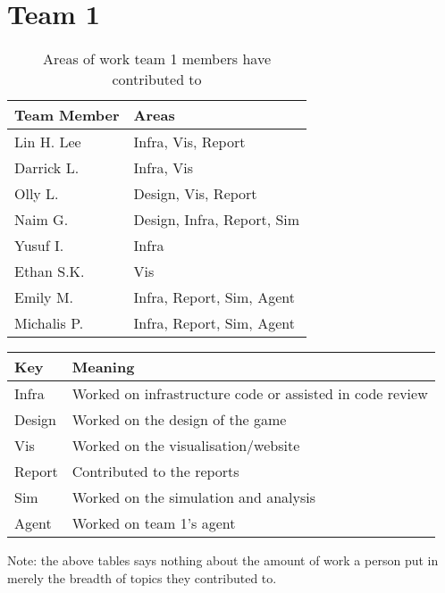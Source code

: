 \section{Team 1}
\label{sec:roles_appendix:team1}

\begin{table}[!h]
    \centering
    \begin{tabular}{|l|l|}
    \hline
    \textbf{Team Member} & \textbf{Areas}     \\ \hline
    Lin H. Lee  & Infra, Vis, Report         \\
    Darrick L.  & Infra, Vis                 \\
    Olly L.     & Design, Vis, Report        \\
    Naim G.     & Design, Infra, Report, Sim \\
    Yusuf I.    & Infra                      \\
    Ethan S.K.  & Vis                        \\
    Emily M.    & Infra, Report, Sim, Agent  \\
    Michalis P. & Infra, Report, Sim, Agent  \\ \hline
\end{tabular}
\caption{Areas of work team 1 members have contributed to}
\label{sec:roles_appendix:team1}
\end{table}

\begin{table}[!h]
    \centering
    \begin{tabular}{|l|l|}
    \hline
    \textbf{Key}    & \textbf{Meaning}                               \\ \hline
    Infra  & Worked on infrastructure code or assisted in code review \\
    Design & Worked on the design of the game                         \\
    Vis    & Worked on the visualisation/website                      \\
    Report & Contributed to the reports                               \\
    Sim    & Worked on the simulation and analysis                    \\
    Agent  & Worked on team 1's agent                                 \\ \hline
    \end{tabular}
    \end{table}

Note: the above tables says nothing about the amount of work a person put in merely the breadth of topics they contributed to.